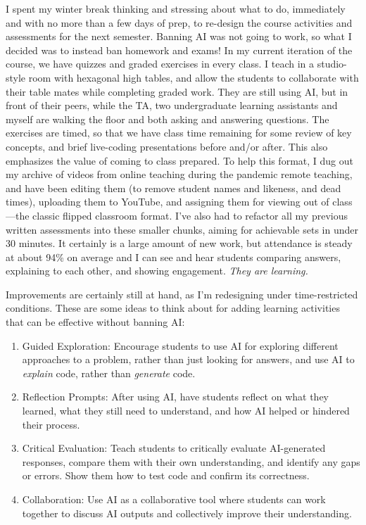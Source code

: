 \documentclass{tufte-handout}
\begin{document}
I spent my winter break thinking and stressing about what to do, immediately and with no more than a few days of prep, to re-design the course activities and assessments for the next semester. Banning AI was not going to work, so what I decided was to instead ban homework and exams! In my current iteration of the course, we have quizzes and graded exercises in every class. I teach in a studio-style room with hexagonal high tables, and allow the  students to collaborate with their table mates while completing graded work. They are still using AI, but in front of their peers, while the TA, two undergraduate learning assistants and myself are walking the floor and both asking and answering questions. The exercises are timed, so that we have class time remaining for some review of key concepts, and brief live-coding presentations before and/or after. This also emphasizes the value of coming to class prepared. To help this format, I dug out my archive of videos from online teaching during the pandemic remote teaching, and have been editing them (to remove student names and likeness, and dead times), uploading them to YouTube, and assigning them for viewing out of class—the classic flipped classroom format. I’ve also had to refactor all my previous written assessments into these smaller chunks, aiming for achievable sets in under 30 minutes. It certainly is a large amount of new work, but attendance is steady at about 94\% on average and I can see and hear students comparing answers, explaining to each other, and showing engagement. \emph{They are learning.}

Improvements are certainly still at hand, as I’m redesigning under time-restricted conditions. These are some ideas to think about for adding learning activities that can be effective without banning AI:

\begin{enumerate}
    \item Guided Exploration: Encourage students to use AI for exploring different approaches to a problem, rather than just looking for answers, and use AI to \emph{explain} code, rather than \emph{generate} code.
    \item Reflection Prompts: After using AI, have students reflect on what they learned, what they still need to understand, and how AI helped or hindered their process.
    \item Critical Evaluation: Teach students to critically evaluate AI-generated responses, compare them with their own understanding, and identify any gaps or errors. Show them how to test code and confirm its correctness.
    \item Collaboration: Use AI as a collaborative tool where students can work together to discuss AI outputs and collectively improve their understanding.
\end{enumerate}
\end{document}
